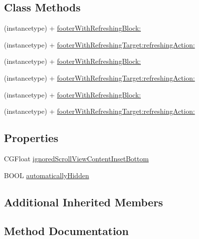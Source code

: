 \subsection*{Class Methods}
\begin{DoxyCompactItemize}
\item 
(instancetype) + \mbox{\hyperlink{interface_m_j_refresh_footer_abfe740f0e9b87fde24cd1975d6b47933}{footer\+With\+Refreshing\+Block\+:}}
\item 
(instancetype) + \mbox{\hyperlink{interface_m_j_refresh_footer_a5cafac545e56be7cad42b8f3919a8d23}{footer\+With\+Refreshing\+Target\+:refreshing\+Action\+:}}
\item 
(instancetype) + \mbox{\hyperlink{interface_m_j_refresh_footer_abfe740f0e9b87fde24cd1975d6b47933}{footer\+With\+Refreshing\+Block\+:}}
\item 
(instancetype) + \mbox{\hyperlink{interface_m_j_refresh_footer_a5cafac545e56be7cad42b8f3919a8d23}{footer\+With\+Refreshing\+Target\+:refreshing\+Action\+:}}
\item 
(instancetype) + \mbox{\hyperlink{interface_m_j_refresh_footer_abfe740f0e9b87fde24cd1975d6b47933}{footer\+With\+Refreshing\+Block\+:}}
\item 
(instancetype) + \mbox{\hyperlink{interface_m_j_refresh_footer_a5cafac545e56be7cad42b8f3919a8d23}{footer\+With\+Refreshing\+Target\+:refreshing\+Action\+:}}
\end{DoxyCompactItemize}
\subsection*{Properties}
\begin{DoxyCompactItemize}
\item 
C\+G\+Float \mbox{\hyperlink{interface_m_j_refresh_footer_a7ab5c8c115a1a3162cd50471ff36597c}{ignored\+Scroll\+View\+Content\+Inset\+Bottom}}
\item 
B\+O\+OL \mbox{\hyperlink{interface_m_j_refresh_footer_a4a457473a1eb23f992faca40f3443e1c}{automatically\+Hidden}}
\end{DoxyCompactItemize}
\subsection*{Additional Inherited Members}


\subsection{Method Documentation}
\mbox{\label{interface_m_j_refresh_footer_a1494271a77136e3b12f5ebc8be8dd383}} 
